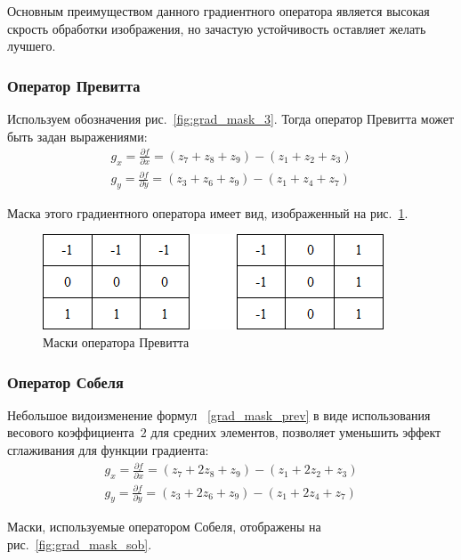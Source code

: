 \documentclass[12pt,a4paper]{article} %
\begin{document}
Основным преимуществом данного градиентного оператора является высокая скрость обработки изображения, но зачастую устойчивость оставляет желать лучшего. 

\subsubsection{Оператор Превитта}

Используем обозначения рис.~\ref{fig:grad_mask_3}. Тогда оператор Превитта может быть задан выражениями:
\begin{gather}\label{grad_mask_prev}
	g_x = \frac{\partial f}{\partial x} = (z_7+z_8+z_9)-(z_1+z_2+z_3)\\
	g_y = \frac{\partial f}{\partial y} = (z_3+z_6+z_9)-(z_1+z_4+z_7)
\end{gather}

Маска этого градиентного оператора имеет вид, изображенный на рис.~\ref{fig:grad_mask_prev}.

\begin{figure}[h]
	
	\centering
	
	\includegraphics[width=0.4\linewidth]{grad_mask_prev.jpg}
	
	\caption{Маски оператора Превитта}
	
	\label{fig:grad_mask_prev}
	
\end{figure}

\subsubsection{Оператор Собеля}

Небольшое видоизменение формул ~\ref{grad_mask_prev} в виде использования весового коэффициента~$2$ для средних элементов, позволяет уменьшить эффект сглаживания для функции градиента:
\begin{gather}\label{grad_mask_sob}
	g_x = \frac{\partial f}{\partial x} = (z_7+2z_8+z_9)-(z_1+2z_2+z_3)\\
	g_y = \frac{\partial f}{\partial y} = (z_3+2z_6+z_9)-(z_1+2z_4+z_7)
\end{gather}

Маски, используемые оператором Собеля, отображены на рис.~\ref{fig:grad_mask_sob}.
\end{document}
